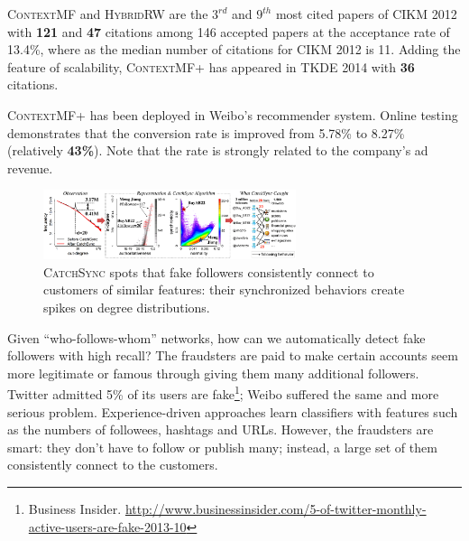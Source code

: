\documentclass[10.5pt]{article}
\begin{document}
\begin{compactitem}
\item \textsc{ContextMF} \cite{jiang2012socialcontextual} and \textsc{HybridRW} \cite{jiang2012socialrecommendation} are the $3^{rd}$ and $9^{th}$ most cited papers of CIKM 2012 with \textbf{121} and \textbf{47} citations among 146 accepted papers at the acceptance rate of 13.4\%, where as the median number of citations for CIKM 2012 is 11. Adding the feature of scalability, \textsc{ContextMF+} \cite{jiang2014scalable} has appeared in TKDE 2014 with \textbf{36} citations.
\item \textsc{ContextMF+} has been deployed in Weibo's recommender system. Online testing demonstrates that the conversion rate is improved from 5.78\% to 8.27\% (relatively \textbf{43\%}). Note that the rate is strongly related to the company's ad revenue.
\end{compactitem}

\vskip 0.03in


\begin{figure}
\vskip -0.12in
\includegraphics[width=0.66\textwidth]{figure/catchsync.pdf}
\vskip -0.18in
\caption{\textsc{CatchSync} \cite{jiang2014catchsync} spots that fake followers consistently connect to customers of similar features: their synchronized behaviors create spikes on degree distributions.}
\label{fig:catchsync}
\vskip -0.12in
\end{figure}

Given ``who-follows-whom'' networks, how can we automatically detect fake followers with high recall? The fraudsters are paid to make certain accounts seem more legitimate or famous through giving them many additional followers. Twitter admitted 5\% of its users are fake\footnote{Business Insider. \url{http://www.businessinsider.com/5-of-twitter-monthly-active-users-are-fake-2013-10}}; Weibo suffered the same and more serious problem. Experience-driven approaches learn classifiers with features such as the numbers of followees, hashtags and URLs. However, the fraudsters are smart: they don't have to follow or publish many; instead, a large set of them consistently connect to the customers.
\end{document}
